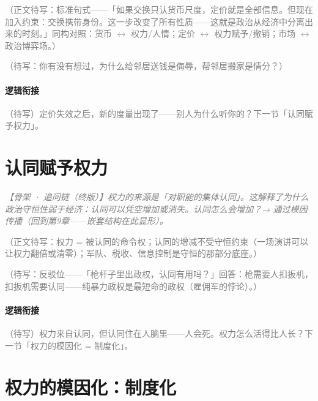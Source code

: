 \documentclass[../../main2.tex]{subfiles}
\begin{document}
	\textcolor{gray}{（正文待写：标准句式——「如果交换只认货币尺度，定价就是全部信息。但现在加入约束：交换携带身份。这一步改变了所有性质——这就是政治从经济中分离出来的时刻。」同构对照：货币 $\leftrightarrow$ 权力/人情；定价 $\leftrightarrow$ 权力赋予/撤销；市场 $\leftrightarrow$ 政治博弈场。）}

	\begin{readingnote}
		\textcolor{gray}{（待写：你有没有想过，为什么给邻居送钱是侮辱，帮邻居搬家是情分？）}
	\end{readingnote}

	\paragraph*{逻辑衔接}
	\textcolor{gray}{（待写）定价失效之后，新的度量出现了——别人为什么听你的？下一节「认同赋予权力」。}

	\section{认同赋予权力}
	\label{sec:pol-recognition}

	\textcolor{gray}{\textit{【骨架 · 追问链（终版）】权力的来源是「对职能的集体认同」。这解释了为什么政治守恒性弱于经济：认同可以凭空增加或消失。认同怎么会增加？→ 通过模因传播（回到第9章——嵌套结构在此显形）。}}

	\textcolor{gray}{（正文待写：权力 = 被认同的命令权；认同的增减不受守恒约束（一场演讲可以让权力翻倍或清零）；军队、税收、信息控制是守恒的那部分底座。）}

	\begin{questionbox}
		\textcolor{gray}{（待写：反驳位——「枪杆子里出政权，认同有用吗？」回答：枪需要人扣扳机，扣扳机需要认同——纯暴力政权是最短命的政权（雇佣军的悖论）。）}
	\end{questionbox}

	\paragraph*{逻辑衔接}
	\textcolor{gray}{（待写）权力来自认同，但认同住在人脑里——人会死。权力怎么活得比人长？下一节「权力的模因化 = 制度化」。}

	\section{权力的模因化：制度化}
	\label{sec:pol-institutionalization}
\end{document}
